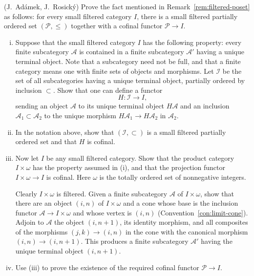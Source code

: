 \begin{Exercises}
	\item (J.\ Adámek, J.\ Rosický) Prove the fact mentioned in Remark~\ref{rem:filtered-poset} as follows: for every small filtered category $I$, there is a small filtered partially ordered set $(\mathcal{P},\leq)$ together with a cofinal functor $\mathcal{P}\to I$.
	\begin{enumerate}[(i)]
		\item Suppose that the small filtered category $I$ has the following property: every finite subcategory $\mathcal{A}$ is contained in a finite subcategory $\mathcal{A}'$ having a unique terminal object. Note that a subcategory need not be full, and that a finite category means one with finite sets of objects and morphisms. Let $\mathcal{I}$ be the set of all subcategories having a unique terminal object, partially ordered by inclusion $\subset$. Show that one can define a functor
		\[ H: \mathcal{I} \to I, \]
		sending an object $\mathcal{A}$ to its unique terminal object $H\mathcal{A}$ and an inclusion $\mathcal{A}_1\subset\mathcal{A}_2$ to the unique morphism $H\mathcal{A}_1\to H\mathcal{A}_2$ in $\mathcal{A}_2$.
		\item In the notation above, show that $(\mathcal{I},\subset)$ is a small filtered partially ordered set and that $H$ is cofinal.
		\item Now let $I$ be any small filtered category. Show that the product category $I\times\omega$ has the property assumed in (i), and that the projection functor $I\times\omega\to I$ is cofinal. Here $\omega$ is the totally ordered set of nonnegative integers.

		\begin{hint}
			Clearly $I\times\omega$ is filtered. Given a finite subcategory $\mathcal{A}$ of $I\times\omega$, show that there are an object $(i,n)$ of $I\times\omega$ and a cone whose base is the inclusion functor $\mathcal{A}\to I\times\omega$ and whose vertex is $(i,n)$ (Convention~\ref{con:limit-cone}). Adjoin to $\mathcal{A}$ the object $(i,n+1)$, its identity morphism, and all composites of the morphisms $(j,k)\to(i,n)$ in the cone with the canonical morphism $(i,n)\to(i,n+1)$. This produces a finite subcategory $\mathcal{A}'$ having the unique terminal object $(i,n+1)$.
		\end{hint}

		\item Use (iii) to prove the existence of the required cofinal functor $\mathcal{P}\to I$.
	\end{enumerate}


\end{Exercises}

